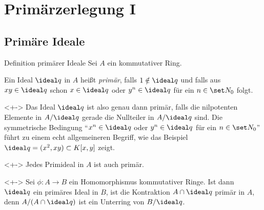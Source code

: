 \section{Primärzerlegung I}

\subsection{Primäre Ideale}


\begin{frame}{Definition primärer Ideale}
	Sei \(A\) ein kommutativer Ring.
	\begin{definition}
		Ein Ideal \(\ideal q\) in \(A\) heißt \emph{primär}, falls \(1 \notin \ideal q\) und falls aus \(x y \in
		\ideal q\) schon \(x \in \ideal q\) oder \(y^n \in \ideal q\) für ein \(n \in \set N_0\) folgt.
	\end{definition}
	\begin{visibleenv}<+->
		Das Ideal \(\ideal q\) ist also genau dann primär, falls die nilpotenten Elemente in \(A/\ideal q\) gerade die
		Nullteiler in \(A/\ideal q\) sind.
		Die symmetrische Bedingung "`$x^n \in \ideal q$ oder $y^n \in
		\ideal q$ für ein $n \in \set N_0$"' führt zu einem echt
		allgemeineren Begriff, wie das Beispiel $\ideal q = (x^2, xy)
		\subset K[x,y]$ zeigt.
	\end{visibleenv}
	\begin{example}<+->
		Jedes Primideal in \(A\) ist auch primär.
	\end{example}
	\begin{example}<+->
		Sei \(\phi\colon A \to B\) ein Homomorphismus kommutativer Ringe. Ist dann \(\ideal q\) ein primäres Ideal in
		\(B\), ist die Kontraktion \(A \cap \ideal q\) primär in \(A\), denn \(A/(A \cap \ideal q)\) ist ein Unterring
		von \(B/\ideal q\).
	\end{example}
\end{frame}

